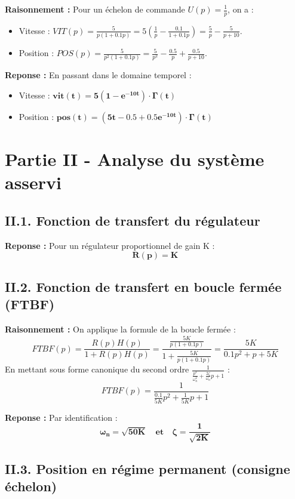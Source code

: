 \documentclass[11pt,a4paper]{article}
\begin{document}
\textbf{Raisonnement :} Pour un échelon de commande $U(p) = \frac{1}{p}$, on a :
\begin{itemize}
    \item Vitesse : $VIT(p) = \frac{5}{p(1+0.1p)} = 5 \left( \frac{1}{p} - \frac{0.1}{1+0.1p} \right) = \frac{5}{p} - \frac{5}{p+10}$.
    \item Position : $POS(p) = \frac{5}{p^2(1+0.1p)} = \frac{5}{p^2} - \frac{0.5}{p} + \frac{0.5}{p+10}$.
\end{itemize}

\textbf{Reponse :} En passant dans le domaine temporel :
\begin{itemize}
    \item Vitesse : $\mathbf{vit(t) = 5(1 - e^{-10t}) \cdot \Gamma(t)}$
    \item Position : $\mathbf{pos(t) = (5t - 0.5 + 0.5e^{-10t}) \cdot \Gamma(t)}$
\end{itemize}

\hrulefill

\section*{Partie II - Analyse du système asservi}

\subsection*{II.1. Fonction de transfert du régulateur}

\textbf{Reponse :} Pour un régulateur proportionnel de gain K :
$$ 
\mathbf{R(p) = K} 
$$

\subsection*{II.2. Fonction de transfert en boucle fermée (FTBF)}

\textbf{Raisonnement :} On applique la formule de la boucle fermée :
$$ 
FTBF(p) = \frac{R(p)H(p)}{1 + R(p)H(p)} = \frac{\frac{5K}{p(1+0.1p)}}{1 + \frac{5K}{p(1+0.1p)}} = \frac{5K}{0.1p^2 + p + 5K} 
$$
En mettant sous forme canonique du second ordre $\frac{1}{\frac{p^2}{\omega_n^2} + \frac{2\zeta}{\omega_n}p + 1}$ :
$$ 
FTBF(p) = \frac{1}{\frac{0.1}{5K}p^2 + \frac{1}{5K}p + 1} 
$$

\textbf{Reponse :} Par identification :
$$ 
\mathbf{\omega_n = \sqrt{50K} \quad \text{et} \quad \zeta = \frac{1}{\sqrt{2K}}} 
$$

\subsection*{II.3. Position en régime permanent (consigne échelon)}
\end{document}
